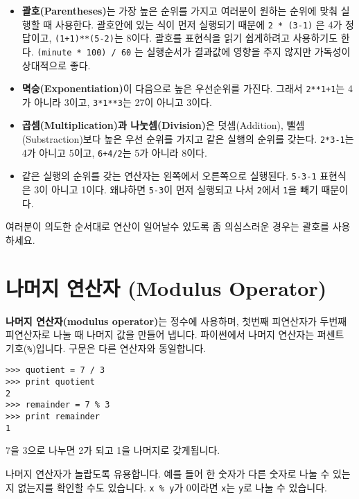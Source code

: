 
\begin{itemize}

\item {\bf 괄호(Parentheses)}는 가장 높은 순위를 가지고 여러분이 원하는 순위에 맞춰 실행할 때 사용한다. 괄호안에 있는 식이 먼저 실행되기 때문에 {\tt 2 * (3-1)} 은 4가 정답이고, {\tt (1+1)**(5-2)}는 8이다. 괄호를 표현식을 읽기 쉽게하려고 사용하기도 한다. {\tt (minute * 100) / 60} 는 실행순서가 결과값에 영향을 주지 않지만 가독성이 상대적으로 좋다.

\item {\bf 멱승(Exponentiation)}이 다음으로 높은 우선순위를 가진다. 그래서 {\tt 2**1+1}는 4가 아니라 3이고, {\tt 3*1**3}는 27이 아니고 3이다. 

\item {\bf 곱셈(Multiplication)과 나눗셈(Division)}은 덧셈(Addition), 뺄셈(Substraction)보다 높은 우선 순위를 가지고 같은 실행의 순위를 갖는다. {\tt 2*3-1}는 4가 아니고 5이고, {\tt 6+4/2}는 5가 아니라 8이다.

\item 같은 실행의 순위를 갖는 연산자는 왼쪽에서 오른쪽으로 실행된다. {\tt 5-3-1} 표현식은 3이 아니고 1이다. 왜냐하면 {\tt 5-3}이 먼저 실행되고 나서 {\tt 2}에서 {\tt 1}을 빼기 때문이다.

\end{itemize}

여러분이 의도한 순서대로 연산이 일어날수 있도록 좀 의심스러운 경우는 괄호를 사용하세요.

\section{나머지 연산자 (Modulus Operator)}


{\bf 나머지 연산자(modulus operator)}는 정수에 사용하며, 첫번째 피연산자가 두번째 피연산자로 나눌 때 나머지 값을 만들어 냅니다. 파이썬에서 나머지 연산자는 퍼센트 기호(\verb"%")입니다. 구문은 다른 연산자와 동일합니다.

\beforeverb
\begin{verbatim}
>>> quotient = 7 / 3
>>> print quotient
2
>>> remainder = 7 % 3
>>> print remainder
1
\end{verbatim}
\afterverb
%
7을 3으로 나누면 2가 되고 1을 나머지로 갖게됩니다.

나머지 연산자가 놀랍도록 유용합니다. 예를 들어 한 숫자가 다른 숫자로 나눌 수 있는지 없는지를 확인할 수도 있습니다. {\tt x \% y}가 0이라면 {\tt x}는 {\tt y}로 나눌 수 있습니다.


